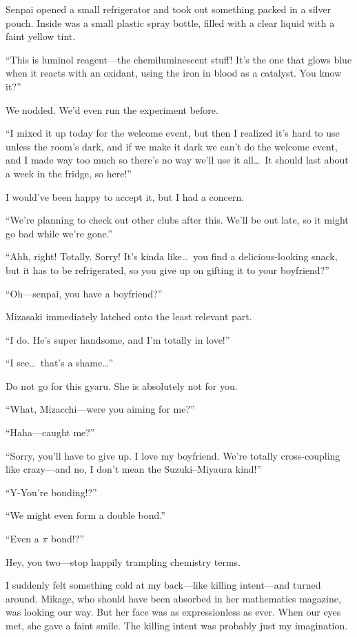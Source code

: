 \documentclass[
    a4paper,
    12pt,
    twoside,
    openany,
    UTF8,
    fontset=windows
]{ctexbook}
\begin{document}
Senpai opened a small refrigerator and took out something packed in a silver pouch. Inside was a small plastic spray bottle, filled with a clear liquid with a faint yellow tint.

``This is luminol reagent---the chemiluminescent stuff! It's the one that glows blue when it reacts with an oxidant, using the iron in blood as a catalyst. You know it?''

We nodded. We'd even run the experiment before.

``I mixed it up today for the welcome event, but then I realized it's hard to use unless the room's dark, and if we make it dark we can't do the welcome event, and I made way too much so there's no way we'll use it all\dots\ It should last about a week in the fridge, so here!''

I would've been happy to accept it, but I had a concern.

``We're planning to check out other clubs after this. We'll be out late, so it might go bad while we're gone.''

``Ahh, right! Totally. Sorry! It's kinda like\dots\ you find a delicious-looking snack, but it has to be refrigerated, so you give up on gifting it to your boyfriend?''

``Oh---senpai, you have a boyfriend?''

Mizasaki immediately latched onto the least relevant part.

``I do. He's super handsome, and I'm totally in love!''

``I see\dots\ that's a shame\dots''

Do not go for this gyaru. She is absolutely not for you.

``What, Mizacchi---were you aiming for me?''

``Haha---caught me?''

``Sorry, you'll have to give up. I love my boyfriend. We're totally cross-coupling like crazy---and no, I don't mean the Suzuki--Miyaura kind!''

``Y-You're bonding!?''

``We might even form a double bond.''

``Even a $\pi$ bond!?''

Hey, you two---stop happily trampling chemistry terms.

I suddenly felt something cold at my back---like killing intent---and turned around. Mikage, who should have been absorbed in her mathematics magazine, was looking our way. But her face was as expressionless as ever. When our eyes met, she gave a faint smile. The killing intent was probably just my imagination.
\end{document}
